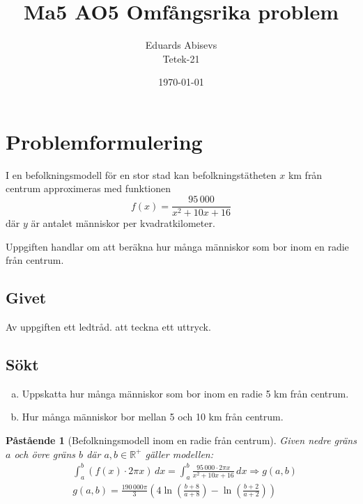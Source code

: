 \documentclass{article}
\title{Ma5 AO5 Omfångsrika problem}
\author{Eduards Abisevs \\ Tetek-21}
\date{\today}
\newtheorem{proposition}{Påstående}
\begin{document}
\maketitle

\section*{Problemformulering}
I en befolkningsmodell för en stor stad kan befolkningstätheten $x$ km från
centrum approximeras med funktionen 
\[
f(x) = \frac{95\,000}{x^2 + 10x + 16}
\]
där $y$ är antalet människor per kvadratkilometer.

Uppgiften handlar om att beräkna hur många människor som bor inom en radie från
centrum.

\noindent
\subsection*{Givet}
Av uppgiften ett ledtråd. att teckna ett uttryck.

\noindent
\subsection*{Sökt}
\begin{enumerate}[(a)]
    \item Uppskatta hur många människor som bor inom en radie 5 km från centrum.
    \item Hur många människor bor mellan 5 och 10 km från centrum.
\end{enumerate}

\begin{proposition}[Befolkningsmodell inom en radie från centrum] Given nedre
	gräns \( a \) och övre gräns \( b \) där \( a,b \in \mathbb{R}^+ \)
	gäller modellen: \begin{align*}
		&\int_{a}^{b} \left(f(x) \cdot 2\pi x\right) \, dx
		= \int_{a}^{b} \frac{95\,000 \cdot 2\pi x}{x^2 + 10x + 16} \, dx
		\Rightarrow g(a,b) \\
		&g(a,b) = \frac{190\,000 \pi}{3}
		\left(4\ln{\left(\frac{b + 8}{a + 8}\right)} 
			-
		\ln{\left(\frac{b + 2}{a + 2}\right)} \right)
	\end{align*}
\end{proposition}
\end{document}
